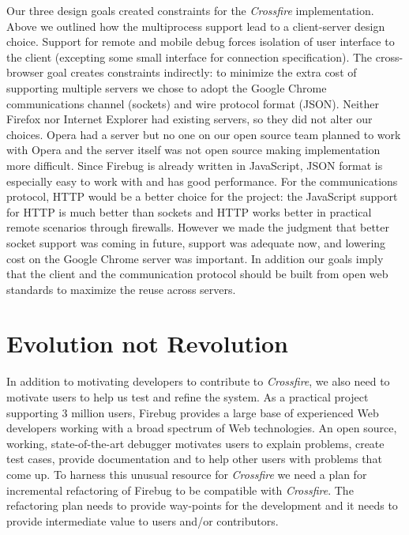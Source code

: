 Our three design goals created constraints for the \textit{Crossfire} implementation.
Above we outlined
how the multiprocess support lead to a client-server design choice. Support for
remote and mobile debug forces isolation of user interface to the client
(excepting some small interface for connection specification). The cross-browser
goal creates constraints indirectly: to minimize the extra cost of supporting
multiple servers we chose to adopt the Google Chrome communications channel
(sockets) and wire protocol format (JSON). Neither Firefox nor Internet Explorer
had existing servers, so they did not alter our choices. Opera had a server but
no one on our open source team planned to work with Opera and the server itself
was not open source making implementation more difficult.  Since Firebug is
already written in JavaScript, JSON format is especially easy to work with and
has good performance\cite{JSON}.  For the communications protocol, HTTP would be
a better choice for the project: the JavaScript support for HTTP is much better
than sockets and HTTP works better in practical remote scenarios through
firewalls.  However we made the judgment that better socket support was coming
in future\cite{WebSockets}, support was adequate now, and lowering cost on the
Google Chrome server was important.  In addition our goals imply that the
client and the communication protocol should be built from open web standards to
maximize the reuse across servers.

\section{Evolution not Revolution}
In addition to motivating developers to contribute to \textit{Crossfire}, we also need to motivate users
to help us test and refine the system.
As a practical project supporting 3 million users, Firebug
provides a large base of experienced Web developers working with a broad spectrum of Web technologies.
An open source, working, state-of-the-art debugger motivates users to explain problems, create test cases,
provide documentation and to help other users with problems that come up. To harness this
 unusual resource  for \textit{Crossfire} we need a plan for incremental refactoring of Firebug to be compatible
with \textit{Crossfire}.  The refactoring plan needs to provide way-points for the development and it needs to
provide intermediate value to users and/or contributors.

